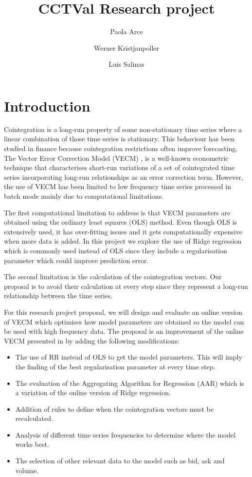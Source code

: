 \documentclass[12pt,reqno]{amsart}
\title[CCTVal Research project]{CCTVal Research project}
\author{Paola Arce}
\author{Werner Kristjanpoller}
\author{Luis Salinas}
\def\blue#1{{\color{blue} #1}}
\begin{document}
\maketitle%

\def\myitem#1{ \item[\blue{\bf #1}] }

\section{Introduction}
Cointegration is a long-run property of some non-stationary time series where a
linear combination of those time series is stationary.  This behaviour has been
studied in finance because cointegration restrictions often improve forecasting.
The Vector Error Correction Model (VECM)  \cite{engle1987}, is a well-known econometric technique
that characterises short-run variations of a set of cointegrated time series
incorporating long-run relationships as an error correction term. However, the use of VECM has been limited to low frequency time series processed in batch mode mainly due to computational limitations. 

The first computational limitation to address is that VECM parameters are obtained using the ordinary least squares (OLS)
method.  Even though OLS is extensively used, it has over-fitting
issues and it gets computationally expensive when more data is added. In this project we explore the use of Ridge regression which is commonly used
instead of OLS since they include a regularisation parameter which could improve
prediction error. 

The second limitation is the calculation of the cointegration vectors. Our proposal is to avoid their calculation at every step since they represent a long-run relationship between the time series.

For this research project proposal, we will design and evaluate an online version of VECM which optimises how model parameters are obtained so the model can be used with high frequency data. The proposal is an improvement of the online VECM presented in \cite{icpram15} by adding the following modifications:
\begin{itemize}
\item The use of RR instead of OLS to get the model parameters. This will imply the finding of the best regularisation parameter at every time step.
\item The evaluation of the Aggregating Algorithm for Regression (AAR) which is a variation of the online version of Ridge regression.
\item Addition of rules to define when the cointegration vectors must be recalculated.
\item Analysis of different time series frequencies to determine where the model works best.
\item The selection of other relevant data to the model such as bid, ask and volume.
\end{itemize}
\end{document}

